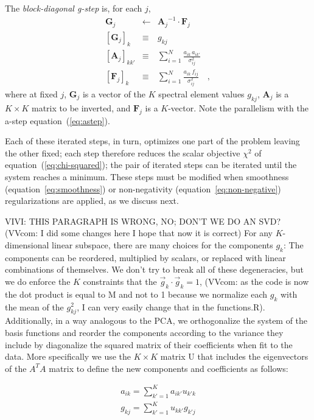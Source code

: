 \documentclass[12pt,preprint]{aastex}
\newcommand{\equationname}{equation}
\newcommand{\tv}[1]{\boldsymbol{#1}}
\newcommand{\inverse}[1]{{#1}^{-1}}
\begin{document}
The \emph{block-diagonal g-step} is, for each $j$,
\begin{eqnarray}\label{eq:gstep}\displaystyle
\tv{G}_j & \gets & \inverse{\tv{A}_j}\cdot\tv{F}_j \nonumber\\
\left[\tv{G}_j\right]_k & \equiv & g_{kj} \nonumber\\
\left[\tv{A}_j\right]_{kk'} & \equiv & \sum_{i=1}^{N} \frac{a_{ik}\,a_{ik'}}{\sigma_{ij}^2} \nonumber\\
\left[\tv{F}_j\right]_k     & \equiv & \sum_{i=1}^{N} \frac{a_{ik}\,f_{i j}}{\sigma_{ij}^2}
\quad ,
\end{eqnarray}
where at fixed $j$, $\tv{G}_j$ is a vector of the $K$ spectral element
values $g_{kj}$, $\tv{A}_j$ is a $K\times K$ matrix to be inverted, and
$\tv{F}_j$ is a $K$-vector.  Note the parallelism with the a-step
\equationname~(\ref{eq:astep}).

Each of these iterated steps, in turn, optimizes one part of the
problem leaving the other fixed; each step therefore reduces the
scalar objective $\chi^2$ of \equationname~(\ref{eq:chi-squared}); the
pair of iterated steps can be iterated until the system reaches a
minimum.  These steps must be modified when smoothness
(\equationname~\ref{eq:smoothness}) or non-negativity
(\equationname~\ref{eq:non-negative}) regularizations are applied, as
we discuss next.

VIVI: THIS PARAGRAPH IS WRONG, NO; DON'T WE DO AN SVD? (VVcom: I did some 
changes here I hope that now it is correct)
For any $K$-dimensional linear subspace, there are many choices for
the components $g_k$: The components can be reordered, multiplied by
scalars, or replaced with linear combinations of themselves.  We don't
try to break all of these degeneracies, but we do enforce the
$K$ constraints that the $\vec{g}_k\cdot\vec{g}_k=1$, (VVcom: as the code 
is now the dot product is equal to M and not to 1 because we normalize each $g_k$ with 
the mean of the $g_{kj}^2$, I can very easily change that in the functions.R). 
Additionally, in a way analogous to the PCA,  we orthogonalize the system of the basis 
functions and reorder the components according to the variance they include 
by diagonalize the squared matrix of their coefficients when fit to the data.
More specifically we use the $K\times K$ matrix U that includes the eigenvectors 
of the $A^TA$ matrix to define the new components and coefficients as follows:

\begin{eqnarray}\label{eq:ordering}
a_{ik}=\sum_{k'=1}^{K}a_{ik'}u_{k'k} \nonumber\\
g_{kj}=\sum_{k'=1}^{K}u_{kk'}g_{k'j}
\end{eqnarray}
\end{document}
